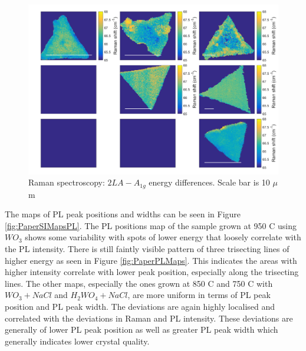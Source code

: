 \documentclass[12pt]{article}
\begin{document}
\begin{figure}[h]
	\begin{center}
		\includegraphics[scale=0.3]{PaperSIMapsDifference.png}
		\caption{Raman spectroscopy: $2LA-A_{1g}$ energy differences. Scale bar is 10 $\mu$m}
		\label{fig:PaperSIMapsDifference}
	\end{center}
\end{figure}

The maps of PL peak positions and widths can be seen in Figure \ref{fig:PaperSIMapsPL}. The PL positions map of the sample grown at 950 {\degree}C using $WO_3$ shows some variability with spots of lower energy that loosely correlate with the PL intensity. There is still faintly visible pattern of three trisecting lines of higher energy as seen in Figure \ref{fig:PaperPLMaps}. This indicates the areas with higher intensity correlate with lower peak position, especially along the trisecting lines. The other maps, especially the ones grown at 850 {\degree}C and 750 {\degree}C with $WO_3 + NaCl$ and $H_2WO_4 + NaCl$, are more uniform in terms of PL peak position and PL peak width. The deviations are again highly localised and correlated with the deviations in Raman and PL intensity. These deviations are generally of lower PL peak position as well as greater PL peak width which generally indicates lower crystal quality.
\end{document}
